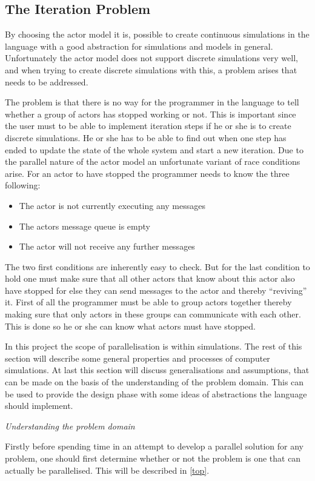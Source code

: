\subsection{The Iteration Problem}
By choosing the actor model it is, possible to create continuous simulations in the language with a good abstraction for simulations and models in general. Unfortunately the actor model does not support discrete simulations very well, and when trying to create discrete simulations with this, a problem arises that needs to be addressed.

The problem is that there is no way for the programmer in the language to tell whether a group of actors has stopped working or not. This is important since the user must to be able to implement iteration steps if he or she is to create discrete simulations. He or she has to be able to find out when one step has ended to update the state of the whole system and start a new iteration. Due to the parallel nature of the actor model an unfortunate variant of race conditions arise.
For an actor to have stopped the programmer needs to know the three following:
\begin{itemize}
\item The actor is not currently executing any messages
\item The actors message queue is empty
\item The actor will not receive any further messages
\end{itemize}
The two first conditions are inherently easy to check. But for the last condition to hold one must make sure that all other actors that know about this actor also have stopped for else they can send messages to the actor and thereby \enquote{reviving} it. First of all the programmer must be able to group actors together thereby making sure that only actors in these groups can communicate with each other. This is done so he or she can know what actors must have stopped.

In this project the scope of parallelisation is within simulations. The rest of this section will describe some general properties and processes of computer simulations. At last this section will discuss generalisations and assumptions, that can be made on the basis of the understanding of the problem domain. This can be used to provide the design phase with some ideas of abstractions the language should implement.

\emph{Understanding the problem domain}

Firstly before spending time in an attempt to develop a parallel solution for any problem, one should first determine whether or not the problem is one that can actually be parallelised. This will be described in \cref{top}.

